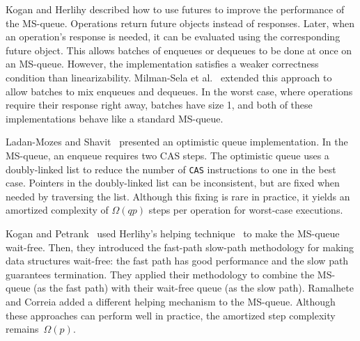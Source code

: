 Kogan and Herlihy \cite{DBLP:conf/podc/KoganH14} described how to use futures to improve
the performance of the MS-queue.
Operations return future
objects instead of responses. Later, when an operation's response is needed, it
can be evaluated using the corresponding future object.
This allows batches of enqueues or dequeues to be done at once on an MS-queue.
However, the implementation satisfies a weaker correctness condition than linearizability.
Milman-Sela et al.~\cite{MKLLP22} extended this approach to allow batches
to mix enqueues and dequeues.
In the worst case, where operations require their response right away,
batches have size 1, and both of these implementations behave like a standard MS-queue.

Ladan-Mozes and Shavit~\cite{DBLP:journals/dc/Ladan-MozesS08}
presented an optimistic  queue implementation. 
In the MS-queue, an enqueue requires two CAS steps.
The optimistic queue uses a doubly-linked list to reduce the number of
\texttt{CAS} instructions to one in the best case. 
Pointers in the doubly-linked list can be inconsistent, but are fixed when needed by traversing the list.
Although this fixing is rare in practice, it yields an amortized complexity of $\Omega(qp)$ 
steps per operation for worst-case executions.

Kogan and Petrank~\cite{DBLP:conf/ppopp/KoganP11} 
used Herlihy's helping
technique~\cite{10.1145/114005.102808} to make the MS-queue
wait-free.
Then, they introduced the 
fast-path slow-path methodology \cite{10.1145/2370036.2145835} for making data structures wait-free:
the fast path has good performance and the slow path guarantees termination.
They applied their methodology to combine the MS-queue (as the fast path)
with their wait-free queue (as the slow path).
Ramalhete and Correia \cite{RC17} added a different helping mechanism to the MS-queue.
Although these approaches can perform well in practice,
the amortized step complexity remains~$\Omega(p)$. 

